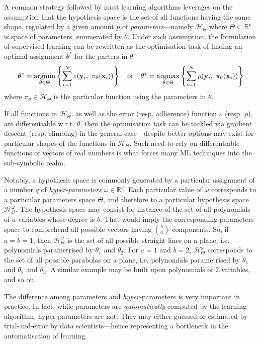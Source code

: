 \documentclass[12pt,a4paper,openright,twoside]{book}
\begin{document}
A common strategy followed by most learning algorithms leverages on the assumption that the hypothesis space is the set of all functions having the same shape, regulated by a given amount $p$ of \emph{parameters}---namely $\mathcal{H}_\Theta$ where $\Theta \subseteq \mathbb{R}^p$ is space of parameters, enumerated by $\theta$.
Under such assumption, the formulation of supervised learning can be rewritten as the optimisation task of finding an optimal assignment $\theta^*$ for the parters in $\theta$:
%
$$
\theta^* = \underset{\theta \in \Theta}{\text{argmin}} \left\{  \sum_{i=1}^{N} \varepsilon(\mathbf{y}_i,\ \pi_\theta(\mathbf{x}_i))  \right\}
\quad \text{or} \quad
\theta^* = \underset{\theta \in \Theta}{\text{argmax}} \left\{  \sum_{i=1}^{N} \rho(\mathbf{y}_i,\ \pi_\theta(\mathbf{x}_i))  \right\}
$$
%
where $\pi_\theta \in \mathcal{H}_\Theta$ is the particular function using the parameters in $\theta$.

If all functions in $\mathcal{H}_\Theta$, as well as the error (resp. adherence) function $\varepsilon$ (resp. $\rho$), are differentiable w.r.t. $\theta$, then the optimisation task can be tackled via gradient descent (resp. climbing) in the general case---despite better options may exist for particular shapes of the functions in $\mathcal{H}_\Theta$.
%
Such need to rely on differentiable functions of vectors of real numbers is what forces many ML techniques into the sub-symbolic realm.

Notably, a hypothesis space is commonly generated by a particular assignment of a number $q$ of \emph{hyper-parameters} $\omega \in \mathbb{R}^q$.
%
Each particular value of $\omega$ corresponds to a particular parameters space $\Theta$, and therefore to a particular hypothesis space $\mathcal{H}_\Theta^\omega$.
%
The hypothesis space may consist for instance of the set of all polynomials of $a$ variables whose degree is $b$.
%
That would imply the corresponding parameters space to comprehend all possible vectors having $\binom{b}{a}$ components.
%
So, if $a = b = 1$, then $\mathcal{H}_\Theta^\omega$ is the set of all possible straight lines on a plane, i.e. polynomials parametrised by $\theta_1$ and $\theta_2$.
%
For $a = 1$ and $b = 2$, $\mathcal{H}_\Theta^\omega$ corresponds to the set of all possible parabolas on a plane, i.e. polynomials parametrised by $\theta_1$ and $\theta_2$ and $\theta_3$.
%
A similar example may be built upon polynomials of 2 variables, and so on.

The difference among parameters and \emph{hyper-}parameters is very important in practice.
%
In fact, while parameters are \emph{automatically} computed by the learning algorithm, hyper-parameters are not.
%
They may either guessed or estimated by trial-and-error by data scientists---hence representing a bottleneck in the automatisation of learning. 
\end{document}
